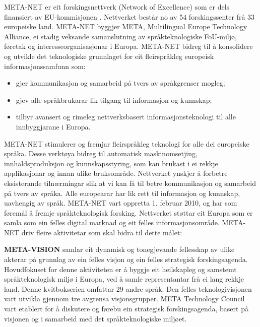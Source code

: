 \begin{multicols}{2}

META-NET er eit forskingsnettverk (Network of Excellence) som er dels finansiert av EU-kommisjonen \cite{rehm2011}. Nettverket består no av 54 forskingssenter frå 33 europeiske land. META-NET byggjer META, Multilingual Europe Technology Alliance, ei stadig veksande samanslutning av språkteknologiske FoU-miljø, føretak og interesseorganisasjonar i Europa.
META-NET bidreg til å konsolidere og utvikle det teknologiske grunnlaget for eit fleirspråkleg europeisk informasjonssamfunn som:

\begin{itemize}
\item gjer kommunikasjon og samarbeid på tvers av språkgrenser mogleg;
\item gjev alle språkbrukarar lik tilgang til informasjon og kunnskap;
\item tilbyr avansert og rimeleg nettverksbasert informasjonsteknologi til alle innbyggjarane i Europa.
\end{itemize}

META-NET stimulerer og fremjar fleirspråkleg teknologi for alle dei europeiske språka. Desse verktøya bidreg til automatisk maskinomsetjing, innhaldsproduksjon og kunnskapsstyring, som kan brukast i ei rekkje applikasjonar og innan ulike bruksområde. Nettverket ynskjer å forbetre eksisterande tilnærmingar slik at vi kan få til betre kommunikasjon og samarbeid på tvers av språka. Alle europearar har lik rett til informasjon og kunnskap, uavhengig av språk.
META-NET vart oppretta 1. februar 2010, og har som føremål å fremje språkteknologisk forsking. Nettverket støttar eit Europa som er samla som ein felles digital marknad og eit felles informasjonsområde. META-NET driv fleire aktivitetar som skal bidra til dette målet: %

\textbf{META-VISION} samlar eit dynamisk og tonegjevande fellesskap av ulike aktørar på grunnlag av ein felles visjon og ein felles strategisk forskingsagenda. Hovudfokuset for denne aktiviteten er å byggje eit heilskapleg og samstemt språkteknologisk miljø i Europa, ved å samle representantar frå ei lang rekkje land. Denne kvitbokserien omfattar 29 andre språk. Den felles teknologivisjonen vart utvikla gjennom tre avgrensa visjonsgrupper. META Technology Council vart etablert for å diskutere og førebu ein strategisk forskingsagenda, basert på visjonen og i 
samarbeid med det språkteknologiske miljøet.


\end{multicols}
